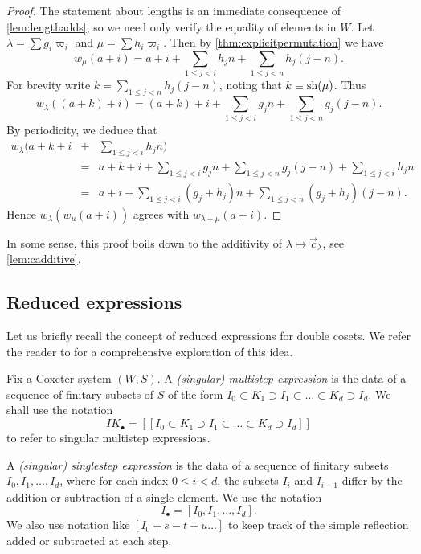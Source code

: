 \begin{proof} The statement about lengths is an immediate consequence of \cref{lem:lengthadds}, so we need only verify the equality of elements in $W$. Let $\lambda = \sum g_i \varpi_i$ and $\mu = \sum h_i \varpi_i$. Then by \cref{thm:explicitpermutation} we have
\begin{equation} w_{\mu}(a+i) = a+i + \sum_{1 \le j<i} h_j n + \sum_{1 \le j < n} h_j(j-n). \end{equation}
For brevity write $k = \sum_{1 \le j < n} h_j(j-n)$, noting that $k \equiv \operatorname{sh}(\mu)$. Thus
\begin{equation} w_{\lambda}((a + k) + i) = (a + k) + i + \sum_{1 \le j<i} g_j n + \sum_{1 \le j < n} g_j(j-n). \end{equation}
By periodicity, we deduce that
\begin{eqnarray} w_{\lambda}(a + k +i &+& \sum_{1 \le j<i} h_j n) \\ \nonumber &=& a + k + i + \sum_{1 \le j<i} g_j n + \sum_{1 \le j < n} g_j(j-n) + \sum_{1 \le j<i} h_j n \\ \nonumber &=&
a + i + \sum_{1 \le j<i} (g_j + h_j) n + \sum_{1 \le j < n} (g_j + h_j)(j-n). \end{eqnarray}
Hence $w_{\lambda}(w_{\mu}(a+i))$ agrees with $w_{\lambda + \mu}(a + i)$.
\end{proof}

In some sense, this proof boils down to the additivity of $\lambda \mapsto \vec{c}_{\lambda}$, see \cref{lem:cadditive}. 

\subsection{Reduced expressions}

Let us briefly recall the concept of reduced expressions for double cosets. We refer the reader to \cite{EKo} for a comprehensive exploration of this idea.

\begin{defn}
Fix a Coxeter system $(W,S)$. 
A  \emph{(singular) multistep expression} is the data of a sequence  of finitary subsets of $S$ of the form $I_0 \subset K_1 \supset I_1 \subset \ldots \subset K_{d} \supset I_d.$ We shall use the notation 
\begin{equation}\label{multistepprototype} IK_{\bullet}=[[I_0 \subset K_1 \supset I_1 \subset \ldots \subset K_{d} \supset I_d]]\end{equation}
to refer to singular multistep expressions.

A \emph{(singular) singlestep expression} is the data of a sequence of finitary subsets $I_0,I_1, \ldots, I_d$, where for each index $0 \le i < d$, the subsets $I_i$ and $I_{i+1}$ differ by the addition or subtraction of a single element. We use the notation 
\begin{equation} \label{singlestepprototype} I_{\bullet} = [I_0,I_1, \ldots, I_d].\end{equation} We also use notation like $[I_0 + s - t + u \ldots]$ to keep track of the simple reflection added or subtracted at each step. \end{defn}

